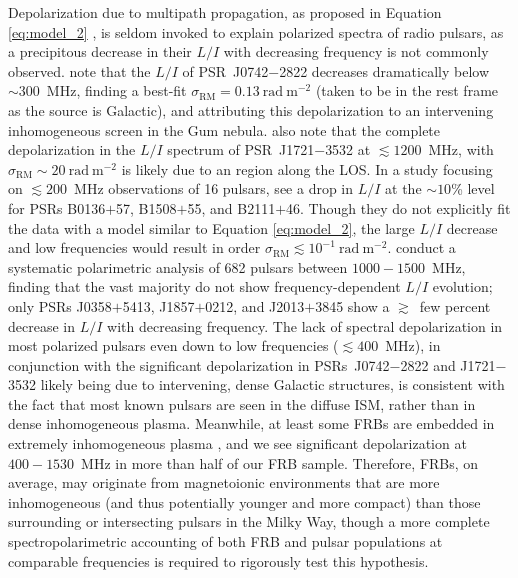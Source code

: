 \documentclass[twocolumn, linenumbers]{aastex701}
\begin{document}
Depolarization due to multipath propagation, as proposed in Equation \ref{eq:model_2} \citep{1966MNRAS.133...67B}, is seldom invoked to explain polarized spectra of radio pulsars, as a precipitous decrease in their $L/I$ with decreasing frequency is not commonly observed. \cite{2019PASA...36...25X} note that the $L/I$ of PSR~J0742$-$2822 decreases dramatically below $\sim 300$~MHz, finding a best-fit $\sigma_\mathrm{RM} = 0.13~\mathrm{rad}~\mathrm{m}^{-2}$ (taken to be in the rest frame as the source is Galactic), and attributing this depolarization to an intervening inhomogeneous screen in the Gum nebula. \cite{2021MNRAS.504..228S} also note that the complete depolarization in the $L/I$ spectrum of PSR~J1721$-$3532 at $\lesssim 1200$~MHz, with $\sigma_\mathrm{RM} \sim 20~\mathrm{rad}~\mathrm{m}^{-2}$ is likely due to an  region along the LOS. In a study focusing on $\lesssim 200$~MHz observations of 16 pulsars, \cite{2015A&A...576A..62N} see a drop in $L/I$ at the $\sim 10$\% level for PSRs B0136$+$57, B1508$+$55, and B2111$+$46. Though they do not explicitly fit the data with a model similar to Equation \ref{eq:model_2}, the large $L/I$ decrease and low frequencies would result in order $\sigma_\mathrm{RM} \lesssim 10^{-1}~\mathrm{rad}~\mathrm{m}^{-2}$. \cite{2023RAA....23j4002W} conduct a systematic polarimetric analysis of 682 pulsars between $1000-1500$~MHz, finding that the vast majority do not show frequency-dependent $L/I$ evolution; only PSRs J0358$+$5413, J1857$+$0212, and J2013$+$3845 show a $\gtrsim$~few percent decrease in $L/I$ with decreasing frequency. The lack of spectral depolarization in most polarized pulsars even down to low frequencies ($\lesssim 400$~MHz), in conjunction with the significant depolarization in PSRs~J0742$-$2822 and J1721$-$3532 likely being due to intervening, dense Galactic structures, is consistent with the fact that most known pulsars are seen in the diffuse ISM, rather than in dense inhomogeneous plasma. Meanwhile, at least some FRBs are embedded in extremely inhomogeneous plasma \citep[e.g., FRBs~20121102A and 20190520B with $\sigma_\mathrm{RM,host} \sim 44~\mathrm{rad}~\mathrm{m}^{-2}$ and $\sigma_\mathrm{RM,host} \sim 340~\mathrm{rad}~\mathrm{m}^{-2}$, respectively;][]{2022Sci...375.1266F}, and we see significant depolarization at $400-1530$~MHz in more than half of our FRB sample. Therefore, FRBs, on average, may originate from magnetoionic environments that are more inhomogeneous (and thus potentially younger and more compact) than those surrounding or intersecting pulsars in the Milky Way, though a more complete spectropolarimetric accounting of both FRB and pulsar populations at comparable frequencies is required to rigorously test this hypothesis.
\end{document}
